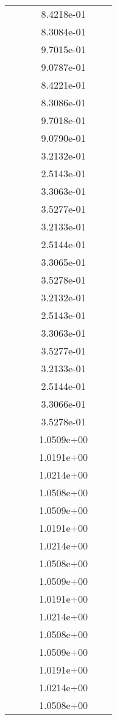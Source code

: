 \begin{xltabular}{\textwidth}{r|rS[table-format=1.3e+2]S[table-format=1.4e+2]S[table-format=1.4e+2]S[table-format=-1.5]}
&  &  & 8.4218e-01 & & \\
&  &  & 8.3084e-01 & & \\
&  &  & 9.7015e-01 & & \\
&  &  & 9.0787e-01 & & \\
&  &  & 8.4221e-01 & & \\
&  &  & 8.3086e-01 & & \\
&  &  & 9.7018e-01 & & \\
&  &  & 9.0790e-01 & & \\
&  &  & 3.2132e-01 & & \\
&  &  & 2.5143e-01 & & \\
&  &  & 3.3063e-01 & & \\
&  &  & 3.5277e-01 & & \\
&  &  & 3.2133e-01 & & \\
&  &  & 2.5144e-01 & & \\
&  &  & 3.3065e-01 & & \\
&  &  & 3.5278e-01 & & \\
&  &  & 3.2132e-01 & & \\
&  &  & 2.5143e-01 & & \\
&  &  & 3.3063e-01 & & \\
&  &  & 3.5277e-01 & & \\
&  &  & 3.2133e-01 & & \\
&  &  & 2.5144e-01 & & \\
&  &  & 3.3066e-01 & & \\
&  &  & 3.5278e-01 & & \\
&  &  & 1.0509e+00 & & \\
&  &  & 1.0191e+00 & & \\
&  &  & 1.0214e+00 & & \\
&  &  & 1.0508e+00 & & \\
&  &  & 1.0509e+00 & & \\
&  &  & 1.0191e+00 & & \\
&  &  & 1.0214e+00 & & \\
&  &  & 1.0508e+00 & & \\
&  &  & 1.0509e+00 & & \\
&  &  & 1.0191e+00 & & \\
&  &  & 1.0214e+00 & & \\
&  &  & 1.0508e+00 & & \\
&  &  & 1.0509e+00 & & \\
&  &  & 1.0191e+00 & & \\
&  &  & 1.0214e+00 & & \\
&  &  & 1.0508e+00 & & \\

\end{xltabular}
